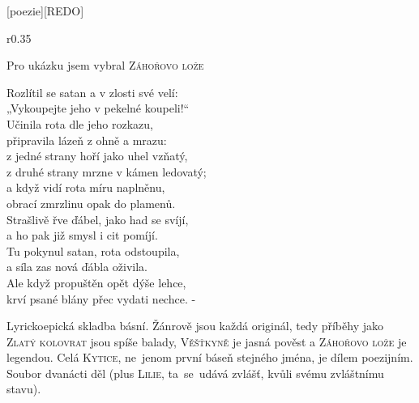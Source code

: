 \documentclass{extarticle} %
\begin{document}
\newpage


\changefontsize{7pt}

[poezie][REDO]

\noindent\begin{wrapfigure}{r}{0.35\textwidth}
\tiny

\setlength{\parindent}{3pt}
Pro ukázku jsem vybral \textsc{Záhořovo lože}
\begin{center}
\noindent
Rozlítil se satan a v zlosti své velí: \\
„Vykoupejte jeho v pekelné koupeli!“ \\
Učinila rota dle jeho rozkazu, \\
připravila lázeň z ohně a mrazu: \\
z jedné strany hoří jako uhel vzňatý, \\
z druhé strany mrzne v kámen ledovatý; \\
a když vidí rota míru naplněnu, \\
obrací zmrzlinu opak do plamenů. \\
Strašlivě řve ďábel, jako had se svíjí, \\
a ho pak již smysl i cit pomíjí. \\
Tu pokynul satan, rota odstoupila, \\
a síla zas nová ďábla oživila. \\
Ale když propuštěn opět dýše lehce, \\
krví psané blány přec vydati nechce. -
\end{center}
\vspace{3em}
\end{wrapfigure}


\noindent 
Lyrickoepická skladba básní.
Žánrově jsou každá originál,
tedy příběhy jako \textsc{Zlatý kolovrat} jsou spíše balady,
\textsc{Věšťkyně} je jasná pověst
a \textsc{Záhořovo lože} je legendou.
Celá \textsc{Kytice}, ne~jenom první báseň stejného jména, je dílem poezijním.
Soubor dvanácti děl (plus \textsc{Lilie}, ta~se~udává zvlášť, kvůli svému zvláštnímu stavu).

\end{document}
